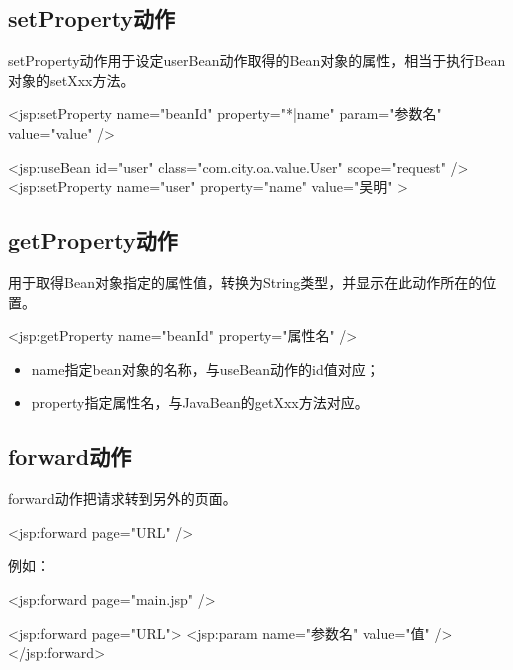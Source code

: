 \subsection{setProperty动作} 

setProperty动作用于设定userBean动作取得的Bean对象的属性，相当于执行Bean对象的setXxx方法。

\begin{jspCode}
  <jsp:setProperty name="beanId" property="*|name" param="参数名" value="value" />
\end{jspCode}

\begin{jspCode}
  <jsp:useBean id="user" class="com.city.oa.value.User" scope="request" />
  <jsp:setProperty name="user" property="name" value="吴明" >
\end{jspCode}

\subsection{getProperty动作} 

用于取得Bean对象指定的属性值，转换为String类型，并显示在此动作所在的位置。

\begin{jspCode}
  <jsp:getProperty name="beanId" property="属性名" />
\end{jspCode}

\begin{itemize}
\item name指定bean对象的名称，与useBean动作的id值对应；
\item property指定属性名，与JavaBean的getXxx方法对应。
\end{itemize}

\subsection{forward动作} 

forward动作把请求转到另外的页面。

\begin{jspCode}
  <jsp:forward page="URL" />
\end{jspCode}

例如：
\begin{jspCode}
  <jsp:forward page="main.jsp" />  
\end{jspCode}


\begin{jspCode}
  <jsp:forward page="URL">
    <jsp:param name="参数名" value="值" />
  </jsp:forward>
\end{jspCode}

